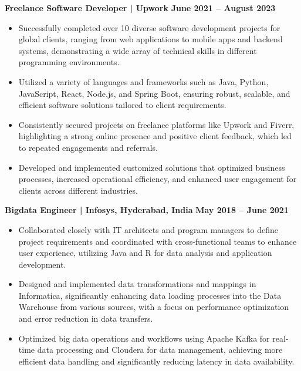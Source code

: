 \documentclass{article}
\begin{document}
\noindent \textbf{Freelance Software Developer | Upwork} \hfill \textbf{June 2021 – August 2023}
\begin{itemize}[noitemsep,nolistsep,leftmargin=*]
\item {\small Successfully completed over 10 diverse software development projects for global clients, ranging from web applications to mobile apps and backend systems, demonstrating a wide array of technical skills in different programming environments.}
\item {\small Utilized a variety of languages and frameworks such as Java, Python, JavaScript, React, Node.js, and Spring Boot, ensuring robust, scalable, and efficient software solutions tailored to client requirements.}
\item {\small Consistently secured projects on freelance platforms like Upwork and Fiverr, highlighting a strong online presence and positive client feedback, which led to repeated engagements and referrals.}
\item {\small Developed and implemented customized solutions that optimized business processes, increased operational efficiency, and enhanced user engagement for clients across different industries.}
\end{itemize}

\noindent \textbf{Bigdata Engineer | Infosys, Hyderabad, India} \hfill \textbf{May 2018 – June 2021}
\begin{itemize}[noitemsep,nolistsep,leftmargin=*]
\item {\small Collaborated closely with IT architects and program managers to define project requirements and coordinated with cross-functional teams to enhance user experience, utilizing Java and R for data analysis and application development.}
\item {\small Designed and implemented data transformations and mappings in Informatica, significantly enhancing data loading processes into the Data Warehouse from various sources, with a focus on performance optimization and error reduction in data transfers.}
\item {\small Optimized big data operations and workflows using Apache Kafka for real-time data processing and Cloudera for data management, achieving more efficient data handling and significantly reducing latency in data availability.}\\
\end{itemize}



%
%
\end{document}
